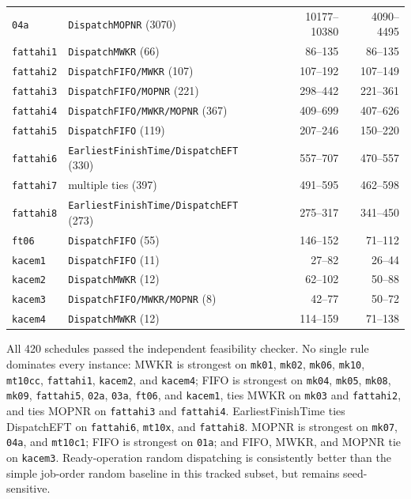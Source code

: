 ﻿\documentclass[11pt]{article}
\begin{document}
\begin{table}[h]
\begin{tabular}{llrr}
\texttt{04a} & \texttt{DispatchMOPNR} (3070) & 10177--10380 & 4090--4495 \\
\texttt{fattahi1} & \texttt{DispatchMWKR} (66) & 86--135 & 86--135 \\
\texttt{fattahi2} & \texttt{DispatchFIFO/MWKR} (107) & 107--192 & 107--149 \\
\texttt{fattahi3} & \texttt{DispatchFIFO/MOPNR} (221) & 298--442 & 221--361 \\
\texttt{fattahi4} & \texttt{DispatchFIFO/MWKR/MOPNR} (367) & 409--699 & 407--626 \\
\texttt{fattahi5} & \texttt{DispatchFIFO} (119) & 207--246 & 150--220 \\
\texttt{fattahi6} & \texttt{EarliestFinishTime/DispatchEFT} (330) & 557--707 & 470--557 \\
\texttt{fattahi7} & multiple ties (397) & 491--595 & 462--598 \\
\texttt{fattahi8} & \texttt{EarliestFinishTime/DispatchEFT} (273) & 275--317 & 341--450 \\
\texttt{ft06} & \texttt{DispatchFIFO} (55) & 146--152 & 71--112 \\
\texttt{kacem1} & \texttt{DispatchFIFO} (11) & 27--82 & 26--44 \\
\texttt{kacem2} & \texttt{DispatchMWKR} (12) & 62--102 & 50--88 \\
\texttt{kacem3} & \texttt{DispatchFIFO/MWKR/MOPNR} (8) & 42--77 & 50--72 \\
\texttt{kacem4} & \texttt{DispatchMWKR} (12) & 114--159 & 71--138 \\
\bottomrule
\end{tabular}
\end{table}

All 420 schedules passed the independent feasibility checker. No single rule
dominates every instance: MWKR is strongest on \texttt{mk01}, \texttt{mk02},
\texttt{mk06}, \texttt{mk10}, \texttt{mt10cc}, \texttt{fattahi1}, \texttt{kacem2}, and \texttt{kacem4}; FIFO is strongest on
\texttt{mk04}, \texttt{mk05}, \texttt{mk08}, \texttt{mk09}, \texttt{fattahi5},
\texttt{02a}, \texttt{03a}, \texttt{ft06}, and \texttt{kacem1}, ties MWKR on
\texttt{mk03} and \texttt{fattahi2}, and ties MOPNR on \texttt{fattahi3} and
\texttt{fattahi4}. EarliestFinishTime ties DispatchEFT on \texttt{fattahi6},
\texttt{mt10x}, and \texttt{fattahi8}.
MOPNR is strongest on \texttt{mk07}, \texttt{04a}, and
\texttt{mt10c1}; FIFO is strongest on \texttt{01a}; and FIFO, MWKR, and MOPNR
tie on \texttt{kacem3}. Ready-operation random
dispatching is consistently better than the simple job-order random baseline
in this tracked subset, but remains seed-sensitive.
\end{document}
